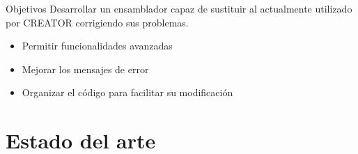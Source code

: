 \documentclass{beamer}
\begin{document}
    \begin{frame}{Objetivos}
        Desarrollar un ensamblador capaz de sustituir al actualmente utilizado
        por CREATOR corrigiendo sus problemas.

        \begin{itemize}
            \item Permitir funcionalidades avanzadas
            \item Mejorar los mensajes de error
            \item Organizar el código para facilitar su modificación
        \end{itemize}
    \end{frame}

    \section{Estado del arte}
\end{document}
